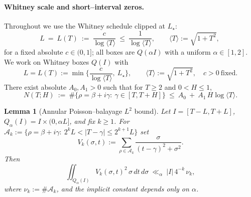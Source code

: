 \documentclass[11pt]{article}
\newtheorem{lemma}[theorem]{Lemma}
\theoremstyle{definition}
\theoremstyle{remark}
\begin{document}
\paragraph{Whitney scale and short–interval zeros.}
Throughout we use the Whitney schedule clipped at $L_\star$:
\[
  L\ =\ L(T)\ :=\ \frac{c}{\log\langle T\rangle}\ \le\ \frac{1}{\log\langle T\rangle},\qquad \langle T\rangle:=\sqrt{1+T^2},\
\]
for a fixed absolute $c\in(0,1]$; all boxes are $Q(\alpha I)$ with a uniform $\alpha\in[1,2]$.
We work on Whitney boxes $Q(I)$ with
\[
  L=L(T):=\min\Big\{\frac{c}{\log\langle T\rangle},\ L_\star\Big\},\qquad \langle T\rangle:=\sqrt{1+T^2},\quad c>0\ \text{fixed}.
\]
There exist absolute $A_0,A_1>0$ such that for $T\ge2$ and $0<H\le1$,
\[
  N(T;H)\ :=\ \#\{\rho=\beta+i\gamma:\ \gamma\in[T,T+H]\}\ \le\ A_0\ +\ A_1\,H\log\langle T\rangle.
\]
\begin{lemma}[Annular Poisson–balayage $L^2$ bound]\label{lem:annular-balayage}
Let $I=[T-L,T+L]$, $Q_\alpha(I)=I\times(0,\alpha L]$, and fix $k\ge1$. For
$\mathcal A_k:=\{\rho=\beta+i\gamma:\ 2^kL<|T-\gamma|\le 2^{k+1}L\}$ set
\[
  V_k(\sigma,t):=\sum_{\rho\in\mathcal A_k}\frac{\sigma}{(t-\gamma)^2+\sigma^2}.
\]
Then
\[
  \iint_{Q_\alpha(I)} V_k(\sigma,t)^2\,\sigma\,dt\,d\sigma\ \ll_\alpha\ |I|\,4^{-k}\,\nu_k,
\]
where $\nu_k:=\#\mathcal A_k$, and the implicit constant depends only on $\alpha$.
\end{lemma}
\end{document}
